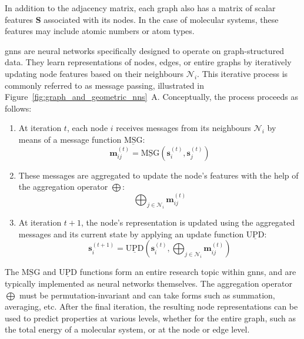 In addition to the adjacency matrix, each graph also has a matrix of scalar features $\mathbf{S}$ associated with its nodes. In the case of molecular systems, these features may include atomic numbers or atom types.

\Acp{gnn} are neural networks specifically designed to operate on graph-structured data. They learn representations of nodes, edges, or entire graphs by iteratively updating node features based on their neighbours $\mathcal{N}_i$. This iterative process is commonly referred to as message passing, illustrated in Figure~\ref{fig:graph_and_geometric_nns}~A. Conceptually, the process proceeds as follows:
\begin{enumerate}
    \item At iteration $t$, each node $i$ receives messages from its neighbours $\mathcal{N}_i$ by means of a message function $\underline{\text{MSG}}$:
    \begin{equation}
        \mathbf{m}_{ij}^{(t)} = \underline{\text{MSG}}\left(\mathbf{s}_i^{(t)}, \mathbf{s}_j^{(t)}\right)
        \label{eq:message_passing}
    \end{equation}

    \item These messages are aggregated to update the node's features with the help of the aggregation operator $\bigoplus$:
    \begin{equation}
        \bigoplus_{j \in \mathcal{N}_i} \mathbf{m}_{ij}^{(t)}
        \label{eq:aggregation}
    \end{equation}
    
    \item At iteration $t + 1$, the node's representation is updated using the aggregated messages and its current state by applying an update function $\underline{\text{UPD}}$:
    \begin{equation}
        \mathbf{s}_i^{(t+1)} = \underline{\text{UPD}}\left(\mathbf{s}_i^{(t)}, \bigoplus_{j \in \mathcal{N}_i} \mathbf{m}_{ij}^{(t)}\right)
        \label{eq:representation_update}
    \end{equation}
\end{enumerate}

The $\underline{\text{MSG}}$ and $\underline{\text{UPD}}$ functions form an entire research topic within \acp{gnn}, and are typically implemented as neural networks themselves. The aggregation operator $\bigoplus$ must be permutation-invariant and can take forms such as summation, averaging, etc. After the final iteration, the resulting node representations can be used to predict properties at various levels, whether for the entire graph, such as the total energy of a molecular system, or at the node or edge level.

